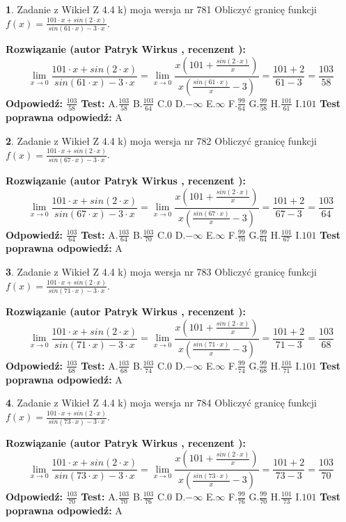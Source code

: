 \documentclass[12pt, a4paper]{article}
\theoremstyle{definition} %
\newtheorem{zad}{}
\newcommand{\zadStart}[1]{\begin{zad}#1\newline}
\newcommand{\zadStop}{\end{zad}}
\newcommand{\rozwStart}[2]{\noindent \textbf{Rozwiązanie (autor #1 , recenzent #2): }\newline}
\newcommand{\rozwStop}{\newline}
\newcommand{\odpStart}{\noindent \textbf{Odpowiedź:}\newline}
\newcommand{\odpStop}{\newline}
\newcommand{\testStart}{\noindent \textbf{Test:}\newline}
\newcommand{\testStop}{\newline}
\newcommand{\kluczStart}{\noindent \textbf{Test poprawna odpowiedź:}\newline}
\newcommand{\kluczStop}{\newline}
\begin{document}
\zadStart{Zadanie z Wikieł Z 4.4 k) moja wersja nr 781}
Obliczyć granicę funkcji $f(x)=\frac{101\cdot x +sin(2\cdot x)}{sin(61\cdot x) -3\cdot x}$.
\zadStop
\rozwStart{Patryk Wirkus}{}
$$\lim\limits_{x\to 0}\frac{101\cdot x +sin(2\cdot x)}{sin(61\cdot x) -3\cdot x}
=\lim\limits_{x\to 0}\frac{x(101+\frac{sin(2\cdot x)}{x})}{x(\frac{sin(61\cdot x)}{x}-3)}
=\frac{101+2}{61-3} = \frac{103}{58}$$
\rozwStop
\odpStart
$\frac{103}{58}$
\odpStop
\testStart
A.$\frac{103}{58}$
B.$\frac{103}{64}$
C.$0$
D.$-\infty$
E.$\infty$
F.$\frac{99}{64}$
G.$\frac{99}{58}$
H.$\frac{101}{61}$
I.$101$
\testStop
\kluczStart
A
\kluczStop



\zadStart{Zadanie z Wikieł Z 4.4 k) moja wersja nr 782}
Obliczyć granicę funkcji $f(x)=\frac{101\cdot x +sin(2\cdot x)}{sin(67\cdot x) -3\cdot x}$.
\zadStop
\rozwStart{Patryk Wirkus}{}
$$\lim\limits_{x\to 0}\frac{101\cdot x +sin(2\cdot x)}{sin(67\cdot x) -3\cdot x}
=\lim\limits_{x\to 0}\frac{x(101+\frac{sin(2\cdot x)}{x})}{x(\frac{sin(67\cdot x)}{x}-3)}
=\frac{101+2}{67-3} = \frac{103}{64}$$
\rozwStop
\odpStart
$\frac{103}{64}$
\odpStop
\testStart
A.$\frac{103}{64}$
B.$\frac{103}{70}$
C.$0$
D.$-\infty$
E.$\infty$
F.$\frac{99}{70}$
G.$\frac{99}{64}$
H.$\frac{101}{67}$
I.$101$
\testStop
\kluczStart
A
\kluczStop



\zadStart{Zadanie z Wikieł Z 4.4 k) moja wersja nr 783}
Obliczyć granicę funkcji $f(x)=\frac{101\cdot x +sin(2\cdot x)}{sin(71\cdot x) -3\cdot x}$.
\zadStop
\rozwStart{Patryk Wirkus}{}
$$\lim\limits_{x\to 0}\frac{101\cdot x +sin(2\cdot x)}{sin(71\cdot x) -3\cdot x}
=\lim\limits_{x\to 0}\frac{x(101+\frac{sin(2\cdot x)}{x})}{x(\frac{sin(71\cdot x)}{x}-3)}
=\frac{101+2}{71-3} = \frac{103}{68}$$
\rozwStop
\odpStart
$\frac{103}{68}$
\odpStop
\testStart
A.$\frac{103}{68}$
B.$\frac{103}{74}$
C.$0$
D.$-\infty$
E.$\infty$
F.$\frac{99}{74}$
G.$\frac{99}{68}$
H.$\frac{101}{71}$
I.$101$
\testStop
\kluczStart
A
\kluczStop



\zadStart{Zadanie z Wikieł Z 4.4 k) moja wersja nr 784}
Obliczyć granicę funkcji $f(x)=\frac{101\cdot x +sin(2\cdot x)}{sin(73\cdot x) -3\cdot x}$.
\zadStop
\rozwStart{Patryk Wirkus}{}
$$\lim\limits_{x\to 0}\frac{101\cdot x +sin(2\cdot x)}{sin(73\cdot x) -3\cdot x}
=\lim\limits_{x\to 0}\frac{x(101+\frac{sin(2\cdot x)}{x})}{x(\frac{sin(73\cdot x)}{x}-3)}
=\frac{101+2}{73-3} = \frac{103}{70}$$
\rozwStop
\odpStart
$\frac{103}{70}$
\odpStop
\testStart
A.$\frac{103}{70}$
B.$\frac{103}{76}$
C.$0$
D.$-\infty$
E.$\infty$
F.$\frac{99}{76}$
G.$\frac{99}{70}$
H.$\frac{101}{73}$
I.$101$
\testStop
\kluczStart
A
\kluczStop
\end{document}
